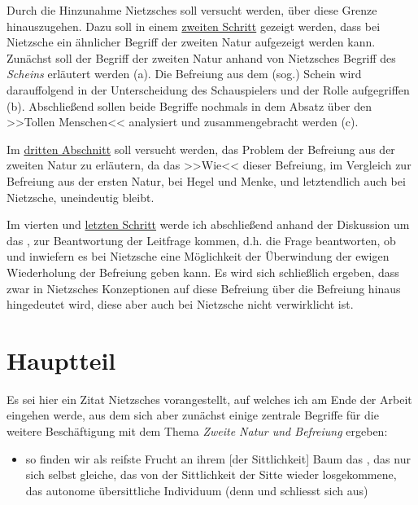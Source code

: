 \documentclass[12pt, a4paper, openany]{report}
\begin{document}
Durch die Hinzunahme Nietzsches soll versucht werden, über diese Grenze hinauszugehen.
Dazu soll in einem \hyperref[abschnitt_2]{zweiten Schritt} gezeigt werden, dass bei Nietzsche ein ähnlicher Begriff der zweiten Natur aufgezeigt werden kann.
Zunächst soll der Begriff der zweiten Natur anhand von Nietzsches Begriff des \textit{Scheins} erläutert werden (a).
Die Befreiung aus dem (sog.) Schein wird darauffolgend in der Unterscheidung des Schauspielers und der Rolle aufgegriffen (b). 
Abschließend sollen beide Begriffe nochmals in dem Absatz über den >>Tollen Menschen<< analysiert und zusammengebracht werden (c).

Im \hyperref[abschnitt_3]{dritten Abschnitt} soll versucht werden, das Problem der Befreiung aus der zweiten Natur zu erläutern, da das >>Wie<< dieser Befreiung, im Vergleich zur Befreiung aus der ersten Natur, bei Hegel und Menke, und letztendlich auch bei Nietzsche, uneindeutig bleibt.

Im vierten und \hyperref[abschnitt_4]{letzten Schritt} werde ich abschließend anhand der Diskussion um das , zur Beantwortung der Leitfrage kommen, d.h. die Frage beantworten, ob und inwiefern es bei Nietzsche eine Möglichkeit der Überwindung der ewigen Wiederholung der Befreiung geben kann. 
Es wird sich schließlich ergeben, dass zwar in Nietzsches Konzeptionen auf diese Befreiung über die Befreiung hinaus hingedeutet wird, diese aber auch bei Nietzsche nicht verwirklicht ist.


\chapter{Hauptteil}

Es sei hier ein Zitat Nietzsches vorangestellt, auf welches ich am Ende der Arbeit eingehen werde, aus dem sich aber zunächst einige zentrale Begriffe für die weitere Beschäftigung mit dem Thema \emph{Zweite Natur und Befreiung} ergeben:

\begin{itemize}
    \item[] \textelp{} so finden wir als reifste Frucht an ihrem [der Sittlichkeit] Baum das  , das nur sich selbst gleiche, das von der Sittlichkeit der Sitte wieder losgekommene, das autonome übersittliche Individuum (denn  und  schliesst sich aus) \textelp{} 
\end{itemize}
\end{document}
